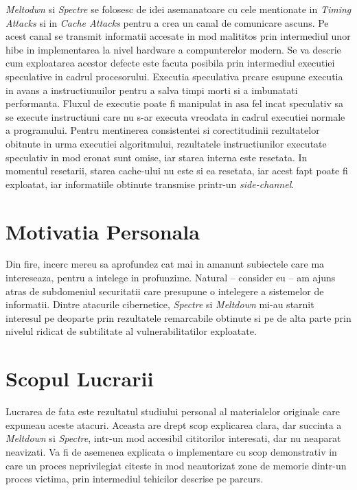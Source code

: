 \emph{Meltodwn} si \emph{Spectre} se folosesc de idei asemanatoare cu cele
mentionate in \emph{Timing Attacks} si in \emph{Cache Attacks} pentru a crea un
canal de comunicare ascuns. Pe acest canal se transmit informatii accesate in
mod malititos prin intermediul unor hibe in implementarea la nivel hardware a
compunterelor modern. Se va descrie cum exploatarea acestor defecte este facuta
posibila prin intermediul executiei speculative in cadrul procesorului.
Executia speculativa prcare esupune executia in avans a instructiunuilor pentru
a salva timpi morti si a imbunatati performanta. Fluxul de executie poate fi
manipulat in asa fel incat speculativ sa se execute instructiuni care nu s-ar
executa vreodata in cadrul executiei normale a programului. Pentru mentinerea
consistentei si corectitudinii rezultatelor obitnute in urma executiei
algoritmului, rezultatele instructiunilor executate speculativ in mod eronat sunt
omise, iar starea interna este resetata. In momentul resetarii, starea cache-ului
nu este si ea resetata, iar acest fapt poate fi exploatat, iar informatiile obtinute
transmise printr-un \emph{side-channel}.

\section{Motivatia Personala}

Din fire, incerc mereu sa aprofundez cat mai in amanunt subiectele care ma
intereseaza, pentru a intelege in profunzime. Natural -- consider eu -- am
ajuns atras de subdomeniul securitatii care presupune o intelegere a sistemelor
de informatii. Dintre atacurile cibernetice, \emph{Spectre} si \emph{Meltdown}
mi-au starnit interesul pe deoparte prin rezultatele remarcabile obtinute si pe
de alta parte prin nivelul ridicat de subtilitate al vulnerabilitatilor
exploatate.

\section{Scopul Lucrarii}

Lucrarea de fata este rezultatul studiului personal al materialelor originale
care expuneau aceste atacuri. Aceasta are drept scop explicarea clara, dar
succinta a \emph{Meltdown} si \emph{Spectre}, intr-un mod accesibil cititorilor
interesati, dar nu neaparat neavizati. Va fi de asemenea explicata o
implementare cu scop demonstrativ in care un proces neprivilegiat citeste in
mod neautorizat zone de memorie dintr-un proces victima, prin intermediul
tehicilor descrise pe parcurs.

